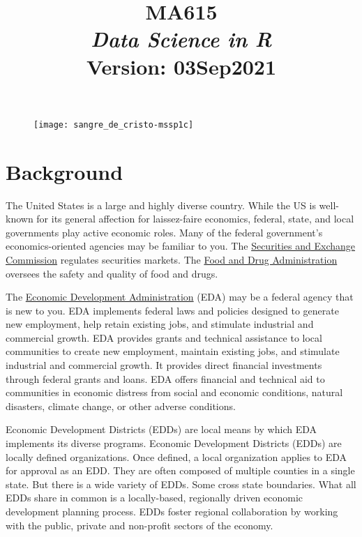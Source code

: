 \documentclass[11pt,letterpaper]{article}
\title{MA615 \\ \textit{Data Science in R} \\ Version: 03Sep2021}
\begin{document}
\begin{figure}[t!]
  \centering
    \texttt{[image: sangre\_de\_cristo-mssp1c]}
\end{figure}

\section*{}

\section*{Background}


The United States is a large and highly diverse country.  While the US is 
well-known for its general affection for laissez-faire economics, federal, 
state, and local governments play active economic roles.  Many of the federal 
government's economics-oriented agencies may be familiar to you.  The 
\href{https://sec.gov/}{Securities and Exchange Commission} regulates 
securities markets.   
The \href{https://fda.gov/}{Food and Drug Administration} oversees the safety 
and quality of food and 
drugs.  

The \href{https://eda.gov/}{Economic Development Administration} (EDA) may be a 
federal agency that is 
new to you.  EDA implements federal laws and policies designed to generate new 
employment, help retain existing jobs, and stimulate industrial and commercial 
growth.   EDA  provides grants and technical assistance to local communities to 
create new employment, maintain existing jobs, and stimulate industrial and 
commercial growth.  It provides direct financial investments through federal 
grants and loans.   EDA offers financial and technical aid to communities in 
economic distress from social and economic conditions, natural disasters, 
climate change, or other adverse conditions.

Economic Development Districts (EDDs) are local means by which EDA implements 
its diverse programs.  Economic Development Districts (EDDs) are locally 
defined organizations.  Once defined, a local organization applies to EDA for 
approval as an EDD.    They are often composed of multiple counties in a single 
state.  But there is a wide variety of EDDs.  Some cross state boundaries.   
What all EDDs share in common is a locally-based, regionally driven economic 
development planning process.  EDDs foster regional collaboration by working 
with the public, private and non-profit sectors of the economy. 
\end{document}
